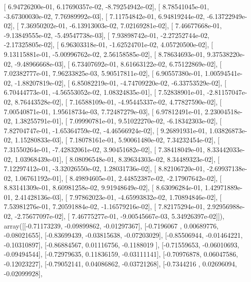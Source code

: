 \documentclass{article}
\begin{document}
       [  6.94726200e-01,   6.17690357e-02,  -8.79254942e-02],
       [  8.78541045e-01,  -3.67300030e-02,   7.76989992e-03],
       [  7.11754842e-01,   6.94819244e-02,  -6.13722949e-02],
       [  7.36950202e-01,  -6.13913003e-02,   7.02169281e-02],
       [  7.46677668e-01,  -9.13849555e-02,  -5.49547738e-03],
       [  7.93898742e-01,  -2.27252744e-02,  -2.17325805e-02],
       [  6.96303318e-01,  -1.62524701e-02,   4.05720500e-02],
       [  9.13115881e-01,  -5.00996762e-02,   2.56158585e-02],
       [  8.78634693e-01,   9.37538220e-02,  -9.48966668e-03],
       [  6.73407692e-01,   8.61663122e-02,   6.75122869e-02],
       [  7.02382777e-01,   7.96233825e-03,   5.90517811e-02],
       [  6.90557380e-01,   1.00594541e-02,  -1.88207819e-02],
       [  6.85082219e-01,  -4.74709220e-02,  -6.33753529e-02],
       [  6.70444773e-01,  -4.56553052e-02,   1.08324835e-01],
       [  7.52838901e-01,  -2.81157047e-02,   8.76443528e-02],
       [  7.16588109e-01,  -4.95445337e-02,   4.77827590e-02],
       [  7.00540871e-01,   1.95618734e-03,   7.72487279e-03],
       [  6.97812491e-01,   2.23004518e-02,   1.38255791e-01],
       [  7.09990781e-01,   9.51022270e-02,  -6.18342303e-02],
       [  7.82704747e-01,  -1.65364759e-02,  -4.46566924e-02],
       [  9.26891931e-01,   1.03826873e-02,   1.15280833e-03],
       [  7.18078161e-01,   5.90061480e-02,   7.34232454e-02],
       [  7.31550264e-01,  -7.42832061e-02,   3.90451682e-02],
       [  7.38418049e-01,   8.33442033e-02,   1.03968439e-01],
       [  8.08096548e-01,   8.39634303e-02,   8.34489323e-02],
       [  7.12297412e-01,  -3.32026550e-02,   1.28031736e-02],
       [  8.82106720e-01,  -2.69937138e-02,   1.06761192e-01],
       [  8.49894605e-01,   2.44852387e-02,  -2.17907642e-02],
       [  8.83141309e-01,   8.60981258e-02,   9.91948649e-02],
       [  8.63096284e-01,   1.42971889e-01,   2.41428136e-03],
       [  7.97862023e-01,  -4.65993832e-02,   1.70894846e-02],
       [  7.53981276e-01,   7.20591884e-02,  -1.16579216e-02],
       [  7.82175294e-01,   2.92956988e-02,  -2.75677097e-02],
       [  7.46775277e-01,  -9.00545667e-03,   5.34926397e-02]]), array([[-0.71173239, -0.09899862, -0.01297367],
       [-0.7196067 ,  0.00689776, -0.08021655],
       [-0.83699439, -0.03815638, -0.07203029],
       [-0.85506944, -0.01464221, -0.10310897],
       [-0.86884567,  0.01116756, -0.1188019 ],
       [-0.71559653, -0.06010693, -0.09494544],
       [-0.72979635,  0.11836159, -0.03111141],
       [-0.70976878,  0.06047586, -0.12023227],
       [-0.79052141,  0.04086862, -0.03721268],
       [-0.7344216 ,  0.02696094, -0.02099928],
\end{document}
